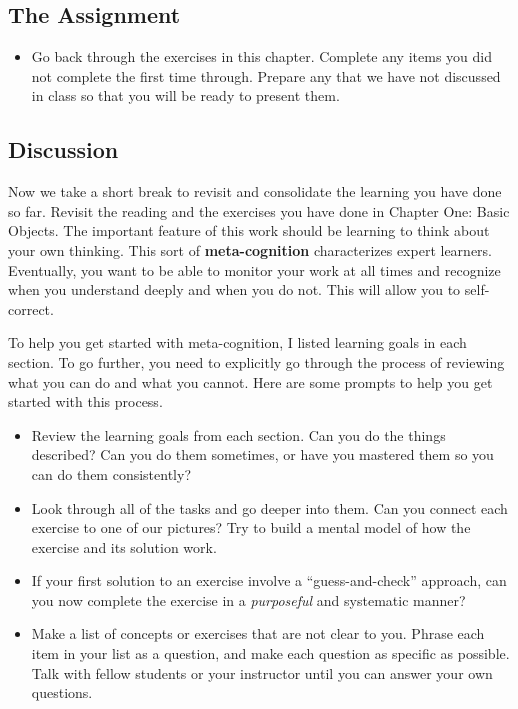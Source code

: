 \documentclass[10pt,]{book}
\newcommand{\terminology}[1]{\textbf{#1}}
\theoremstyle{plain}
\theoremstyle{definition}
\numberwithin{equation}{section}
\begin{document}
\subsection[The Assignment]{The Assignment}\label{subsection-17}
\begin{itemize}
\item{}
        Go back through the exercises in this chapter. Complete any items you
        did not complete the first time through. Prepare any that we have not
        discussed in class so that you will be ready to present them.
      \end{itemize}
\typeout{************************************************}
\typeout{************************************************}
\subsection[Discussion]{Discussion}\label{subsection-18}
Now we take a short break to revisit and consolidate the learning you
      have done so far. Revisit the reading and the exercises you have done in
      Chapter One: Basic Objects. The important feature of this work should be
      learning to think about your own thinking. This sort of \terminology{meta-cognition}
      characterizes expert learners. Eventually, you want to be able to monitor
      your work at all times and recognize when you understand deeply and when
      you do not. This will allow you to self-correct.
\par
To help you get started with meta-cognition, I listed learning goals in
      each section. To go further, you need to explicitly go through the process
      of reviewing what you can do and what you cannot. Here are some prompts to
      help you get started with this process.
      \begin{itemize}
\item{}
          Review the learning goals from each section. Can you do the things
          described? Can you do them sometimes, or have you mastered them so you
          can do them consistently?
        \item{}
          Look through all of the tasks and go deeper into them. Can you
          connect each exercise to one of our pictures? Try to build a mental
          model of how the exercise and its solution work.
        \item{}
          If your first solution to an exercise involve a ``guess-and-check''
          approach, can you now complete the exercise in a \emph{purposeful}
          and systematic manner?
        \item{}
          Make a list of concepts or exercises that are not clear to you. Phrase
          each item in your list as a question, and make each question as
          specific as possible. Talk with fellow students or your
          instructor until you can answer your own questions.
        \end{itemize}
\end{document}
